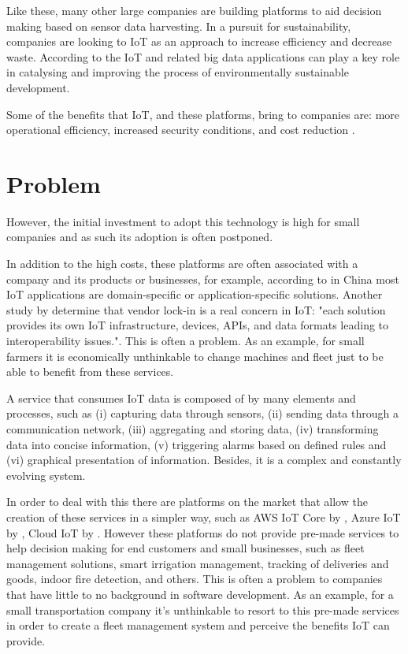 Like these, many other large companies are building platforms to aid decision making based on sensor data harvesting. 
In a pursuit for sustainability, companies are looking to \gls{IoT} as an approach to increase efficiency and decrease waste. According to \cite{BIBRI2018230} the \gls{IoT} and related big data applications can play a key role in catalysing and improving the process of environmentally sustainable development.

Some of the benefits that \gls{IoT}, and these platforms, bring to companies are: more operational efficiency, increased security conditions, and cost reduction \cite{forbes-why-iot}.

\section{Problem}
\label{sec:introduction:problem}

However, the initial investment to adopt this technology is high for small companies and as such its adoption is often postponed.

In addition to the high costs, these platforms are often associated with a company and its products or businesses, for example, according to \cite{6851114} in China most \gls{IoT} applications are domain-specific or application-specific solutions. Another study by \cite{noura2019interoperability} determine that vendor lock-in is a real concern in \gls{IoT}: "each solution provides its own IoT infrastructure, devices, APIs, and data formats leading to interoperability issues.".
This is often a problem. As an example, for small farmers it is economically unthinkable to change machines and fleet just to be able to benefit from these services.

A service that consumes \gls{IoT} data is composed of by many elements and processes, such as (i) capturing data through sensors, (ii) sending data through a communication network, (iii) aggregating and storing data, (iv) transforming data into concise information, (v) triggering alarms based on defined rules and (vi) graphical presentation of information. Besides, it is a complex and constantly evolving system.

In order to deal with this there are platforms on the market that allow the creation of these services in a simpler way, such as AWS IoT Core by \cite{aws-iot}, Azure IoT by \cite{azure-iot}, Cloud IoT by \cite{google-iot}. However these platforms do not provide pre-made services to help decision making for end customers and small businesses, such as fleet management solutions, smart irrigation management, tracking of deliveries and goods, indoor fire detection, and others. This is often a problem to companies that have little to no background in software development. As an example, for a small transportation company it's unthinkable to resort to this pre-made services in order to create a fleet management system and perceive the benefits \gls{IoT} can provide.

